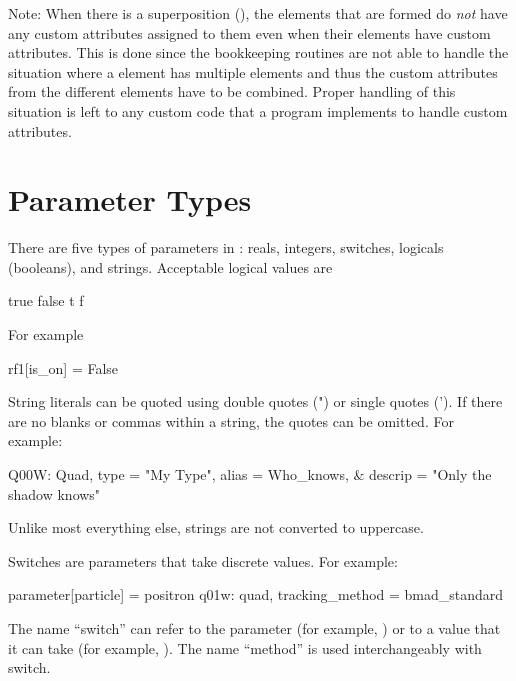 {{{{{Note: When there is a superposition (), the  elements that are formed
do {\em not} have any custom attributes assigned to them even when their  elements
have custom attributes. This is done since the \bmad bookkeeping routines are not able to handle the
situation where a  element has multiple  elements and thus the custom
attributes from the different  elements have to be combined. Proper handling of this
situation is left to any custom code that a program implements to handle custom attributes.

\section{Parameter Types}
\label{s:param.types}

There are five types of parameters in \bmad: reals, integers, switches, logicals (booleans), and
strings. Acceptable logical values are
\begin{example}
   true    false
   t       f
\end{example}
For example
\begin{example}
  rf1[is_on] = False
\end{example}

String literals can be quoted using double quotes (") or single quotes (').  If there are no blanks
or commas within a string, the quotes can be omitted. For example:
\begin{example}
  Q00W: Quad, type = "My Type", alias = Who_knows, &
                                  descrip = "Only the shadow knows"
\end{example}
Unlike most everything else, strings are not converted to uppercase.

Switches are parameters that take discrete values. For example:
\begin{example}
  parameter[particle] = positron          
  q01w: quad, tracking_method = bmad_standard 
\end{example}
The name ``switch'' can refer to the parameter (for example, ) or to a value
that it can take (for example, ). The name ``method'' is used interchangeably with
switch.

}}}}}
